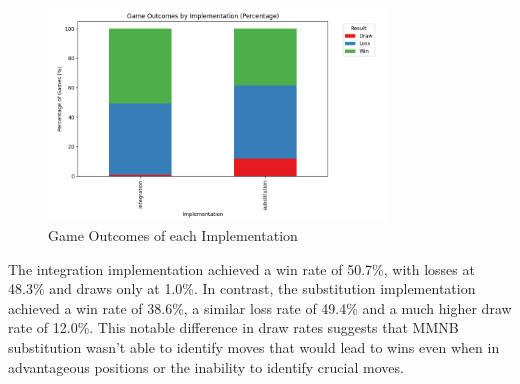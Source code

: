 \begin{figure}[H]
    \centering
    \includegraphics[width=0.8\textwidth]{images/plots/implementation/Implementation_vs_win_rate.png}
    \caption{Game Outcomes of each Implementation}
    \label{fig: implementation_vs_win_rate}
\end{figure}












The integration implementation achieved a win rate of 50.7\%, with losses at 48.3\% and draws only at 1.0\%. In contrast, the substitution implementation achieved a win rate of 38.6\%, a similar loss rate of 49.4\% and a much higher draw rate of 12.0\%. This notable difference in draw rates suggests that MMNB substitution wasn't able to identify moves that would lead to wins even when in advantageous positions or the inability to identify crucial moves. 

